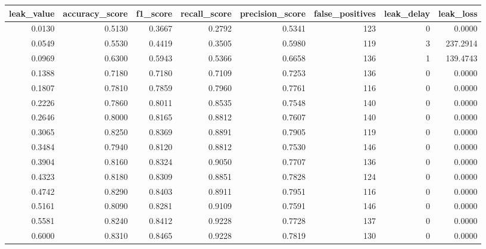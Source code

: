 \begin{tabular}{rrrrrrrr}
\toprule
leak\_value & accuracy\_score & f1\_score & recall\_score & precision\_score & false\_positives & leak\_delay & leak\_loss \\
\midrule
0.0130 & 0.5130 & 0.3667 & 0.2792 & 0.5341 & 123 & 0 & 0.0000 \\
0.0549 & 0.5530 & 0.4419 & 0.3505 & 0.5980 & 119 & 3 & 237.2914 \\
0.0969 & 0.6300 & 0.5943 & 0.5366 & 0.6658 & 136 & 1 & 139.4743 \\
0.1388 & 0.7180 & 0.7180 & 0.7109 & 0.7253 & 136 & 0 & 0.0000 \\
0.1807 & 0.7810 & 0.7859 & 0.7960 & 0.7761 & 116 & 0 & 0.0000 \\
0.2226 & 0.7860 & 0.8011 & 0.8535 & 0.7548 & 140 & 0 & 0.0000 \\
0.2646 & 0.8000 & 0.8165 & 0.8812 & 0.7607 & 140 & 0 & 0.0000 \\
0.3065 & 0.8250 & 0.8369 & 0.8891 & 0.7905 & 119 & 0 & 0.0000 \\
0.3484 & 0.7940 & 0.8120 & 0.8812 & 0.7530 & 146 & 0 & 0.0000 \\
0.3904 & 0.8160 & 0.8324 & 0.9050 & 0.7707 & 136 & 0 & 0.0000 \\
0.4323 & 0.8180 & 0.8309 & 0.8851 & 0.7828 & 124 & 0 & 0.0000 \\
0.4742 & 0.8290 & 0.8403 & 0.8911 & 0.7951 & 116 & 0 & 0.0000 \\
0.5161 & 0.8090 & 0.8281 & 0.9109 & 0.7591 & 146 & 0 & 0.0000 \\
0.5581 & 0.8240 & 0.8412 & 0.9228 & 0.7728 & 137 & 0 & 0.0000 \\
0.6000 & 0.8310 & 0.8465 & 0.9228 & 0.7819 & 130 & 0 & 0.0000 \\
\bottomrule
\end{tabular}
